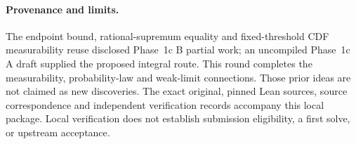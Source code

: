 \documentclass[11pt]{article}
\begin{document}
\paragraph{Provenance and limits.}
The endpoint bound, rational-supremum equality and fixed-threshold CDF
measurability reuse disclosed Phase~1c B partial work; an uncompiled Phase~1c A
draft supplied the proposed integral route. This round completes the
measurability, probability-law and weak-limit connections. Those prior ideas
are not claimed as new discoveries. The exact original, pinned Lean sources,
source correspondence and independent verification records accompany this
local package. Local verification does not establish submission eligibility,
a first solve, or upstream acceptance.
\end{document}
